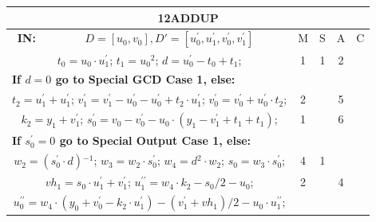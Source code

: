 \begin{tabular}{|c|cr|c|c|c|c|}
\hline
\multicolumn{7}{|c|}{\bf{12ADDUP}} \TS \\
\hline
\bf{IN:} &\multicolumn{2}{|c|}{$D = [u_0,v_0], D' = [u^{\prime}_0,u^{\prime}_1,v^{\prime}_0,v^{\prime}_1]$}
\TS & M & \hspace{1pt}S\hspace{1pt} & A & \hspace{1pt}C\hspace{1pt} \\
\hline
\multicolumn{3}{|R{340pt}|}{ 
$t_0=u_0 \cdot u^{\prime}_1$;\hspace{4pt}
$t_1=u_0{}^{2}$;\hspace{4pt}
$d=u^{\prime}_0-t_0+t_1$;\hspace{4pt}
} & 1 & 1 & 2 & \\
\multicolumn{3}{|l|}{ 
 \bf{If $d = 0$ go to Special GCD Case 1, else:} } &  &  &  & \\
\multicolumn{3}{|R{340pt}|}{ 
$t_2=u^{\prime}_1+u^{\prime}_1$;\hspace{4pt}
$v^{\prime}_1=v^{\prime}_1-u^{\prime}_0-u^{\prime}_0+t_2 \cdot u^{\prime}_1$;\hspace{4pt}
$v^{\prime}_0=v^{\prime}_0+u^{\prime}_0 \cdot t_2$;\hspace{4pt}
} & 2 &  & 5 & \\
\multicolumn{3}{|R{340pt}|}{ 
$k_2=y_1+v^{\prime}_1$;\hspace{4pt}
$s^{\prime}_0=v_0-v^{\prime}_0-u_0 \cdot (y_1-v^{\prime}_1+t_1+t_1)$;\hspace{4pt}
} & 1 &  & 6 & \\
\multicolumn{3}{|l|}{ 
 \bf{If $s^{\prime}_0 = 0$ go to Special Output Case 1, else:} } &  &  &  & \\
\multicolumn{3}{|R{340pt}|}{ 
$w_2=(s^{\prime}_0 \cdot d){}^{-1}$;\hspace{4pt}
$w_3=w_2 \cdot s^{\prime}_0$;\hspace{4pt}
$w_4=d{}^{2} \cdot w_2$;\hspace{4pt}
$s_0=w_3 \cdot s^{\prime}_0$;\hspace{4pt}
} & 4 & 1 &  & \\
\multicolumn{3}{|R{340pt}|}{ 
$vh_1=s_0 \cdot u^{\prime}_1+v^{\prime}_1$;\hspace{4pt}
$u^{\prime\prime}_1=w_4 \cdot k_2-s_0/2-u_0$;\hspace{4pt}
} & 2 &  & 4 & \\
\multicolumn{3}{|R{340pt}|}{ 
$u^{\prime\prime}_0=w_4 \cdot (y_0+v^{\prime}_0-k_2 \cdot u^{\prime}_1)-(v^{\prime}_1+vh_1)/2-u_0 \cdot u^{\prime\prime}_1$;\hspace{4pt}
}
\end{tabular}
